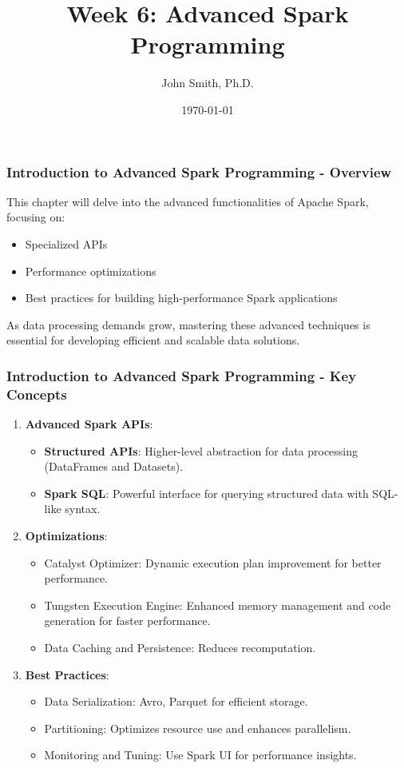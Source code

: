 \documentclass[aspectratio=169]{beamer}
\title[Advanced Spark Programming]{Week 6: Advanced Spark Programming}
\author[J. Smith]{John Smith, Ph.D.}
\institute[University Name]{
  Department of Computer Science\\
  University Name\\
  \vspace{0.3cm}
  Email: email@university.edu\\
  Website: www.university.edu
}
\date{\today}
\begin{document}
\frame{\titlepage}

\begin{frame}[fragile]
    \frametitle{Introduction to Advanced Spark Programming - Overview}
    This chapter will delve into the advanced functionalities of Apache Spark, focusing on:
    \begin{itemize}
        \item Specialized APIs
        \item Performance optimizations
        \item Best practices for building high-performance Spark applications
    \end{itemize}
    As data processing demands grow, mastering these advanced techniques is essential for developing efficient and scalable data solutions.
\end{frame}

\begin{frame}[fragile]
    \frametitle{Introduction to Advanced Spark Programming - Key Concepts}
    \begin{enumerate}
        \item \textbf{Advanced Spark APIs}:
        \begin{itemize}
            \item \textbf{Structured APIs}: Higher-level abstraction for data processing (DataFrames and Datasets).
            \item \textbf{Spark SQL}: Powerful interface for querying structured data with SQL-like syntax.
        \end{itemize}
        
        \item \textbf{Optimizations}:
        \begin{itemize}
            \item Catalyst Optimizer: Dynamic execution plan improvement for better performance.
            \item Tungsten Execution Engine: Enhanced memory management and code generation for faster performance.
            \item Data Caching and Persistence: Reduces recomputation.
        \end{itemize}

        \item \textbf{Best Practices}:
        \begin{itemize}
            \item Data Serialization: Avro, Parquet for efficient storage.
            \item Partitioning: Optimizes resource use and enhances parallelism.
            \item Monitoring and Tuning: Use Spark UI for performance insights.
        \end{itemize}
    \end{enumerate}
\end{frame}
\end{document}

